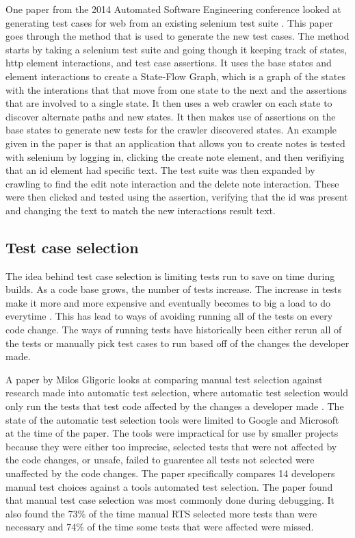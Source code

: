     One paper from the 2014 Automated Software Engineering conference looked at generating test cases for web from an existing selenium test suite \cite{WebTestGeneration}. 
    This paper goes through the method that is used to generate the new test cases. The method starts by taking a selenium test suite and going though it keeping track of states, 
    http element interactions, and test case assertions. It uses the base states and element interactions to create a State-Flow Graph, which is a graph of the states with the interations 
    that that move from one state to the next and the assertions that are involved to a single state. It then uses a web crawler on each state to discover alternate paths and new states. 
    It then makes use of assertions on the base states to generate new tests for the crawler discovered states. An example given in the paper is that an application that allows you to 
    create notes is tested with selenium by logging in, clicking the create note element, and then verifiying that an id element had specific text. The test suite was then expanded by crawling
    to find the edit note interaction and the delete note interaction. These were then clicked and tested using the assertion, verifying that the id was present and changing the text to match the
    new interactions result text.

\subsection{Test case selection}
    The idea behind test case selection is limiting tests run to save on time during builds. As a code base grows, the number of tests increase. The increase in tests make it more and more expensive
    and eventually becomes to big a load to do everytime \cite{googletest, googlescale}. This has lead to ways of avoiding running all of the tests on every code change. The ways of running tests
    have historically been either rerun all of the tests or manually pick test cases to run based off of the changes the developer made.

    A paper by Milos Gligoric looks at comparing manual test selection against research made into automatic test selection, where automatic test selection would only run the tests that test code
    affected by the changes a developer made \cite{TestCaseSelction}. The state of the automatic test selection tools were limited to Google and Microsoft at the time of the paper. The tools were
    impractical for use by smaller projects because they were either too imprecise, selected tests that were not affected by the code changes, or unsafe, failed to guarentee all tests not selected
    were unaffected by the code changes. The paper specifically compares 14 developers manual test choices against a tools automated test selection. The paper found that manual test case selection
    was most commonly done during debugging. It also found the 73\% of the time manual RTS selected more tests than were necessary and 74\% of the time some tests that were affected were missed.


